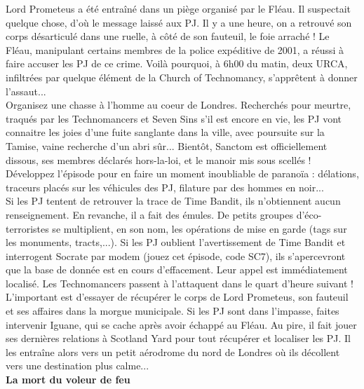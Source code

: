 \documentclass[11pt,twoside,a4paper]{book}
\begin{document}
Lord Prometeus a {\'e}t{\'e} entra{\^i}n{\'e} dans un pi{\`e}ge organis{\'e} par le Fl{\'e}au. Il suspectait quelque chose, d'o{\`u} le message laiss{\'e} aux PJ. Il y a une heure, on a retrouv{\'e} son corps d{\'e}sarticul{\'e} dans une ruelle, {\`a} c{\^o}t{\'e} de son fauteuil, le foie arrach{\'e} ! Le Fl{\'e}au, manipulant certains membres de la police exp{\'e}ditive de 2001, a r{\'e}ussi {\`a} faire accuser les PJ de ce crime. Voil{\`a} pourquoi, {\`a} 6h00 du matin, deux URCA, infiltr{\'e}es par quelque {\'e}l{\'e}ment de la Church of Technomancy, s'appr{\^e}tent {\`a} donner l'assaut...~\\

Organisez une chasse {\`a} l'homme au coeur de Londres. Recherch{\'e}s pour meurtre, traqu{\'e}s par les Technomancers et Seven Sins s'il est encore en vie, les PJ vont connaitre les joies d'une fuite sanglante dans la ville, avec poursuite sur la Tamise, vaine recherche d'un abri s{\^u}r... Bient{\^o}t, Sanctom est officiellement dissous, ses membres d{\'e}clar{\'e}s hors-la-loi, et le manoir mis sous scell{\'e}s ! D{\'e}veloppez l'{\'e}pisode pour en faire un moment inoubliable de parano{\"i}a : d{\'e}lations, traceurs plac{\'e}s sur les v{\'e}hicules des PJ, filature par des hommes en noir...~\\

Si les PJ tentent de retrouver la trace de Time Bandit, ils n'obtiennent aucun renseignement. En revanche, il a fait des {\'e}mules. De petits groupes d'{\'e}co-terroristes se multiplient, en son nom, les op{\'e}rations de mise en garde (tags sur les monuments, tracts,...). Si les PJ oublient l'avertissement de Time Bandit et interrogent Socrate par modem (jouez cet {\'e}pisode, code SC7), ils s'apercevront que la base de donn{\'e}e est en cours d'effacement. Leur appel est imm{\'e}diatement localis{\'e}. Les Technomancers passent {\`a} l'attaquent dans le quart d'heure suivant ! L'important est d'essayer de r{\'e}cup{\'e}rer le corps de Lord Prometeus, son fauteuil et ses affaires dans la morgue municipale. Si les PJ sont dans l'impasse, faites intervenir Iguane, qui se cache apr{\`e}s avoir {\'e}chapp{\'e} au Fl{\'e}au. Au pire, il fait jouer ses derni{\`e}res relations {\`a} Scotland Yard pour tout r{\'e}cup{\'e}rer et localiser les PJ. Il les entra{\^i}ne alors vers un petit a{\'e}rodrome du nord de Londres o{\`u} ils d{\'e}collent vers une destination plus calme...~\\

\textbf{\large La mort du voleur de feu}~\\
\end{document}
